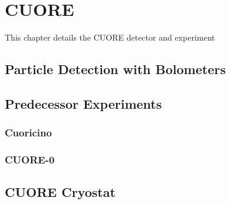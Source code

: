 \chapter{CUORE}

This chapter details the CUORE detector and experiment

\section{Particle Detection with Bolometers}

\section{Predecessor Experiments}

\subsection{Cuoricino}

\subsection{CUORE-0}

\section{CUORE Cryostat}